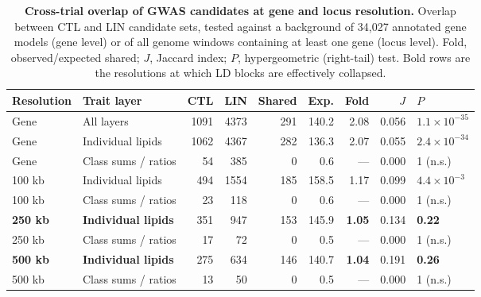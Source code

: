 \documentclass[9pt,twocolumn,twoside]{rilabRxiv}
\begin{document}
\begin{table}[!ht]
\centering
\caption{\textbf{Cross-trial overlap of GWAS candidates at gene and locus resolution.} Overlap between CTL and LIN candidate sets, tested against a background of 34{,}027 annotated gene models (gene level) or of all genome windows containing at least one gene (locus level). Fold, observed/expected shared; $J$, Jaccard index; $P$, hypergeometric (right-tail) test. Bold rows are the resolutions at which LD blocks are effectively collapsed.}
\label{tab:overlap}
\scriptsize
\begin{tabular}{llrrrrrrl}
\toprule
\textbf{Resolution} & \textbf{Trait layer} & \textbf{CTL} & \textbf{LIN} & \textbf{Shared} & \textbf{Exp.} & \textbf{Fold} & \textbf{$J$} & \textbf{$P$} \\
\midrule
Gene   & All layers          & 1091 & 4373 & 291 & 140.2 & 2.08 & 0.056 & $1.1\times10^{-35}$ \\
Gene   & Individual lipids   & 1062 & 4367 & 282 & 136.3 & 2.07 & 0.055 & $2.4\times10^{-34}$ \\
Gene   & Class sums / ratios &   54 &  385 &   0 &   0.6 & --- & 0.000 & 1 (n.s.) \\
\midrule
100 kb & Individual lipids   &  494 & 1554 & 185 & 158.5 & 1.17 & 0.099 & $4.4\times10^{-3}$ \\
100 kb & Class sums / ratios &   23 &  118 &   0 &   0.6 & --- & 0.000 & 1 (n.s.) \\
\textbf{250 kb} & \textbf{Individual lipids} & 351 & 947 & 153 & 145.9 & \textbf{1.05} & 0.134 & \textbf{0.22} \\
250 kb & Class sums / ratios &   17 &   72 &   0 &   0.5 & --- & 0.000 & 1 (n.s.) \\
\textbf{500 kb} & \textbf{Individual lipids} & 275 & 634 & 146 & 140.7 & \textbf{1.04} & 0.191 & \textbf{0.26} \\
500 kb & Class sums / ratios &   13 &   50 &   0 &   0.5 & --- & 0.000 & 1 (n.s.) \\
\bottomrule
\end{tabular}
\end{table}
\end{document}
